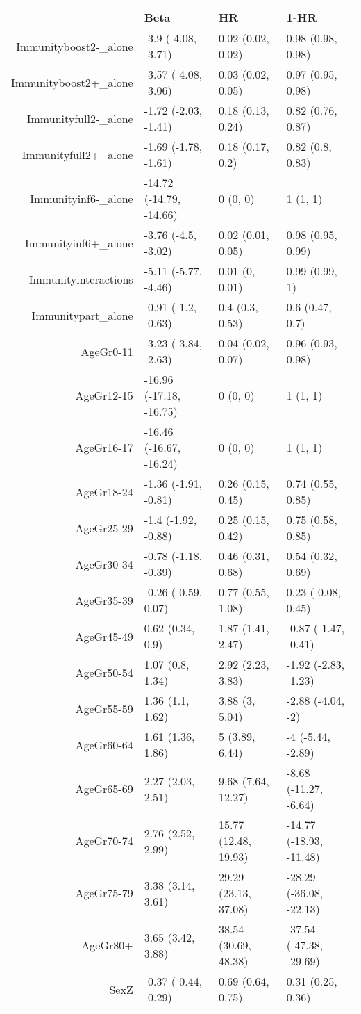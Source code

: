 \begin{table}[ht]
\centering
\begin{tabular}{rlll}
  \hline
 & Beta & HR & 1-HR \\ 
  \hline
Immunityboost2-\_alone & -3.9 (-4.08, -3.71) & 0.02 (0.02, 0.02) & 0.98 (0.98, 0.98) \\ 
  Immunityboost2+\_alone & -3.57 (-4.08, -3.06) & 0.03 (0.02, 0.05) & 0.97 (0.95, 0.98) \\ 
  Immunityfull2-\_alone & -1.72 (-2.03, -1.41) & 0.18 (0.13, 0.24) & 0.82 (0.76, 0.87) \\ 
  Immunityfull2+\_alone & -1.69 (-1.78, -1.61) & 0.18 (0.17, 0.2) & 0.82 (0.8, 0.83) \\ 
  Immunityinf6-\_alone & -14.72 (-14.79, -14.66) & 0 (0, 0) & 1 (1, 1) \\ 
  Immunityinf6+\_alone & -3.76 (-4.5, -3.02) & 0.02 (0.01, 0.05) & 0.98 (0.95, 0.99) \\ 
  Immunityinteractions & -5.11 (-5.77, -4.46) & 0.01 (0, 0.01) & 0.99 (0.99, 1) \\ 
  Immunitypart\_alone & -0.91 (-1.2, -0.63) & 0.4 (0.3, 0.53) & 0.6 (0.47, 0.7) \\ 
  AgeGr0-11 & -3.23 (-3.84, -2.63) & 0.04 (0.02, 0.07) & 0.96 (0.93, 0.98) \\ 
  AgeGr12-15 & -16.96 (-17.18, -16.75) & 0 (0, 0) & 1 (1, 1) \\ 
  AgeGr16-17 & -16.46 (-16.67, -16.24) & 0 (0, 0) & 1 (1, 1) \\ 
  AgeGr18-24 & -1.36 (-1.91, -0.81) & 0.26 (0.15, 0.45) & 0.74 (0.55, 0.85) \\ 
  AgeGr25-29 & -1.4 (-1.92, -0.88) & 0.25 (0.15, 0.42) & 0.75 (0.58, 0.85) \\ 
  AgeGr30-34 & -0.78 (-1.18, -0.39) & 0.46 (0.31, 0.68) & 0.54 (0.32, 0.69) \\ 
  AgeGr35-39 & -0.26 (-0.59, 0.07) & 0.77 (0.55, 1.08) & 0.23 (-0.08, 0.45) \\ 
  AgeGr45-49 & 0.62 (0.34, 0.9) & 1.87 (1.41, 2.47) & -0.87 (-1.47, -0.41) \\ 
  AgeGr50-54 & 1.07 (0.8, 1.34) & 2.92 (2.23, 3.83) & -1.92 (-2.83, -1.23) \\ 
  AgeGr55-59 & 1.36 (1.1, 1.62) & 3.88 (3, 5.04) & -2.88 (-4.04, -2) \\ 
  AgeGr60-64 & 1.61 (1.36, 1.86) & 5 (3.89, 6.44) & -4 (-5.44, -2.89) \\ 
  AgeGr65-69 & 2.27 (2.03, 2.51) & 9.68 (7.64, 12.27) & -8.68 (-11.27, -6.64) \\ 
  AgeGr70-74 & 2.76 (2.52, 2.99) & 15.77 (12.48, 19.93) & -14.77 (-18.93, -11.48) \\ 
  AgeGr75-79 & 3.38 (3.14, 3.61) & 29.29 (23.13, 37.08) & -28.29 (-36.08, -22.13) \\ 
  AgeGr80+ & 3.65 (3.42, 3.88) & 38.54 (30.69, 48.38) & -37.54 (-47.38, -29.69) \\ 
  SexZ & -0.37 (-0.44, -0.29) & 0.69 (0.64, 0.75) & 0.31 (0.25, 0.36) \\ 
   \hline
\end{tabular}
\end{table}
